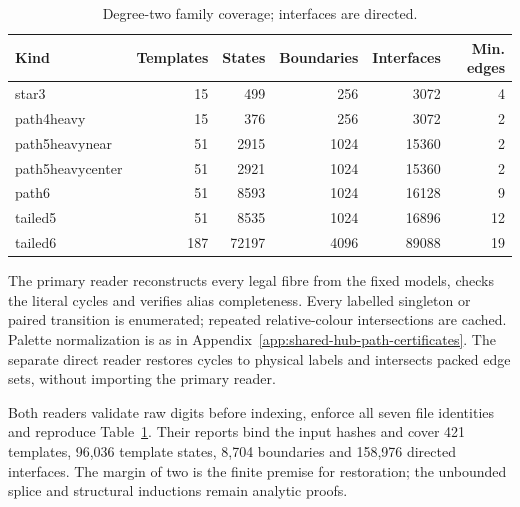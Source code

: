 \documentclass[11pt]{article}
\numberwithin{equation}{section}
\numberwithin{table}{section}
\begin{document}
\begin{table}[htbp]
\centering\small
\caption{Degree-two family coverage; interfaces are directed.}
\label{tab:degree-two-family-counts}
\begin{tabular}{lrrrrr}
\toprule
Kind & Templates & States & Boundaries & Interfaces & Min. edges\\
\midrule
star3&15&499&256&3072&4\\
path4heavy&15&376&256&3072&2\\
path5heavynear&51&2915&1024&15360&2\\
path5heavycenter&51&2921&1024&15360&2\\
path6&51&8593&1024&16128&9\\
tailed5&51&8535&1024&16896&12\\
tailed6&187&72197&4096&89088&19\\
\bottomrule
\end{tabular}
\end{table}

The primary reader reconstructs every legal fibre from the fixed models,
checks the literal cycles and verifies alias completeness. Every labelled
singleton or paired transition is enumerated; repeated relative-colour
intersections are cached. Palette normalization is as in
Appendix~\ref{app:shared-hub-path-certificates}. The separate direct reader
restores cycles to physical labels and intersects packed edge sets,
without importing the primary reader.

Both readers validate raw digits before indexing, enforce all seven file
identities and reproduce Table~\ref{tab:degree-two-family-counts}.
Their reports bind the input hashes and cover 421 templates, 96,036 template
states, 8,704 boundaries and 158,976 directed interfaces. The margin of two
is the finite premise for restoration; the unbounded splice and
structural inductions remain analytic proofs.

\clearpage
\end{document}
